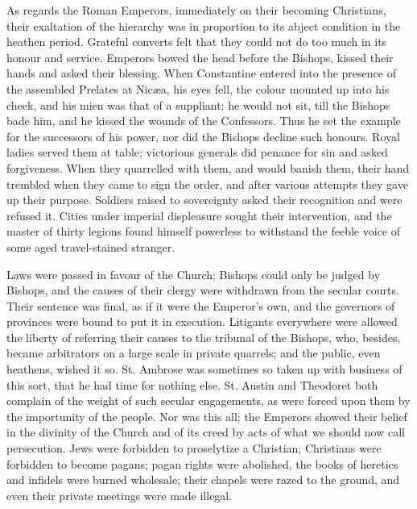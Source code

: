 As regards the Roman Emperors, immediately on their becoming
Christians, their exaltation of the hierarchy was in proportion to its
abject condition in the heathen period. Grateful converts felt that they
could not do too much in its honour and service. Emperors bowed the head
before the Bishops, kissed their hands and asked their blessing. When
Constantine entered into the presence of the assembled Prelates at
Nicæa, his eyes fell, the colour mounted up into his cheek, and his
mien was that of a suppliant; he would not sit, till the Bishops bade
him, and he kissed the wounds of the Confessors. Thus he set the
example for the successors of his power, nor did the Bishops decline
such honours. Royal ladies served them at table; victorious generals did
penance for sin and asked forgiveness. When they quarrelled with them,
and would banish them, their hand trembled when they came to sign the
order, and after various attempts they gave up their purpose. Soldiers
raised to sovereignty asked their recognition and were refused it.
Cities under imperial displeasure sought their intervention, and the
master of thirty legions found himself powerless to withstand the feeble
voice of some aged travel-stained stranger.

Laws were passed in favour of the Church; Bishops could only be
judged by Bishops, and the causes of their clergy were withdrawn from
the secular courts. Their sentence was final, as if it were the
Emperor's own, and the governors of provinces were bound to put it in
execution. Litigants everywhere were allowed the liberty of referring
their causes to the tribunal of the Bishops, who, besides, became
arbitrators on a large scale in private quarrels; and the public, even
heathens, wished it so. St. Ambrose was sometimes so taken up with
business of this sort, that he had time for nothing else. St. Austin and
Theodoret both complain of the weight of such secular engagements, as
were forced upon them by the importunity of the people. Nor was this
all; the Emperors showed their belief in the divinity of the Church and
of its creed by acts of what we should now call persecution. Jews were
forbidden to proselytize a Christian; Christians were forbidden to
become pagans; pagan rights were abolished, the books of heretics and
infidels were burned wholesale; their chapels were razed to the
ground, and even their private meetings were made illegal.

